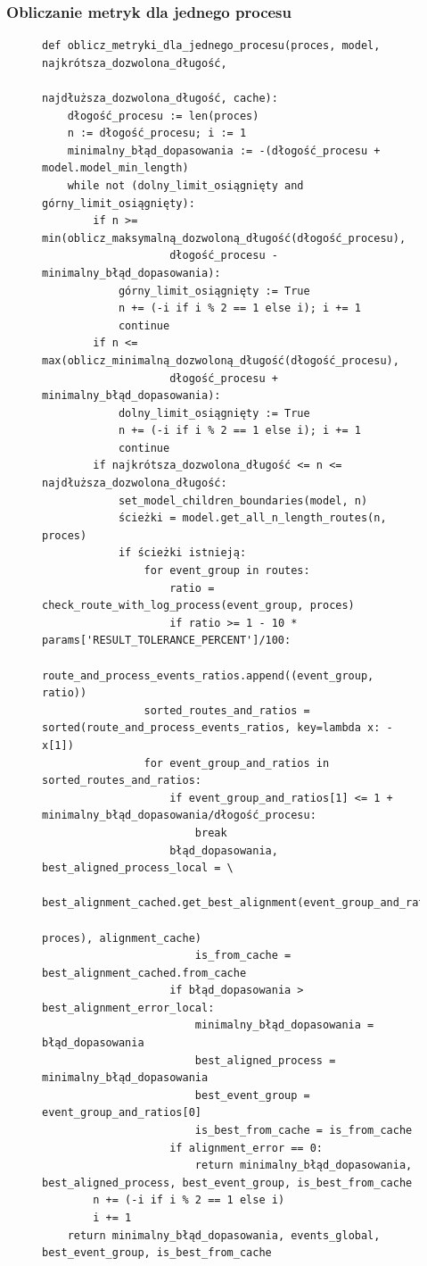\subsubsection{Obliczanie metryk dla jednego procesu}
\clearpage
\begin{figure}[!ht]
\lstset{caption=Obliczanie metryk dla jednego procesu, captionpos=b}
\lstset{label=src:best_result, frame=single}
\begin{lstlisting}
def oblicz_metryki_dla_jednego_procesu(proces, model, najkrótsza_dozwolona_długość, 
				               najdłuższa_dozwolona_długość, cache):
    dłogość_procesu := len(proces)
    n := dłogość_procesu; i := 1
    minimalny_błąd_dopasowania := -(dłogość_procesu + model.model_min_length)
	while not (dolny_limit_osiągnięty and górny_limit_osiągnięty):
        if n >= min(oblicz_maksymalną_dozwoloną_długość(dłogość_procesu), 
                    dłogość_procesu - minimalny_błąd_dopasowania):
            górny_limit_osiągnięty := True
            n += (-i if i % 2 == 1 else i); i += 1
            continue
        if n <= max(oblicz_minimalną_dozwoloną_długość(dłogość_procesu), 
                    dłogość_procesu + minimalny_błąd_dopasowania):
            dolny_limit_osiągnięty := True
            n += (-i if i % 2 == 1 else i); i += 1
            continue
        if najkrótsza_dozwolona_długość <= n <= najdłuższa_dozwolona_długość:
            set_model_children_boundaries(model, n)
            ścieżki = model.get_all_n_length_routes(n, proces)
            if ścieżki istnieją:
                for event_group in routes:
                    ratio = check_route_with_log_process(event_group, proces)
                    if ratio >= 1 - 10 * params['RESULT_TOLERANCE_PERCENT']/100:
                        route_and_process_events_ratios.append((event_group, ratio))
                sorted_routes_and_ratios = sorted(route_and_process_events_ratios, key=lambda x: -x[1])
                for event_group_and_ratios in sorted_routes_and_ratios:
                    if event_group_and_ratios[1] <= 1 + minimalny_błąd_dopasowania/dłogość_procesu:
                        break
                    błąd_dopasowania, best_aligned_process_local = \
                        best_alignment_cached.get_best_alignment(event_group_and_ratios[0],
                                                                 proces), alignment_cache)
                        is_from_cache = best_alignment_cached.from_cache
                    if błąd_dopasowania > best_alignment_error_local:
                        minimalny_błąd_dopasowania = błąd_dopasowania
                        best_aligned_process = minimalny_błąd_dopasowania
                        best_event_group = event_group_and_ratios[0]
                        is_best_from_cache = is_from_cache
                    if alignment_error == 0:
                        return minimalny_błąd_dopasowania, best_aligned_process, best_event_group, is_best_from_cache
        n += (-i if i % 2 == 1 else i)
        i += 1
    return minimalny_błąd_dopasowania, events_global, best_event_group, is_best_from_cache
\end{lstlisting}
\end{figure}

